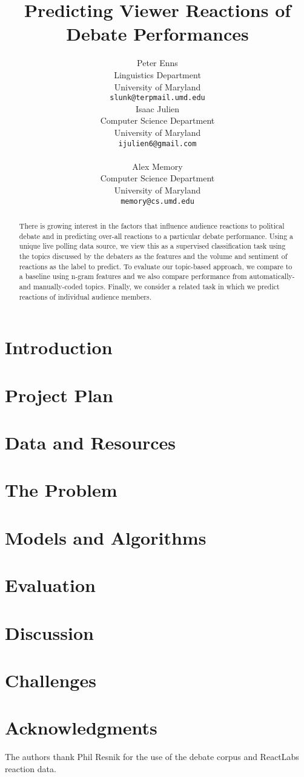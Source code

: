 \documentclass[11pt]{article}
\title{Predicting Viewer Reactions of Debate Performances}
\author{Peter Enns \\
  Linguistics Department \\
  University of Maryland \\
  {\tt slunk@terpmail.umd.edu} \\\And
  Isaac Julien \\
  Computer Science Department \\
  University of Maryland \\
  {\tt ijulien6@gmail.com} \\ \\\And
  Alex Memory \\
  Computer Science Department \\
  University of Maryland \\
  {\tt memory@cs.umd.edu} \\
  }
\date{}
\begin{document}
\maketitle
\begin{abstract}
  There is growing interest in the factors that influence audience reactions to political debate and in predicting over-all reactions to a particular debate performance.  Using a unique live polling data source, we view this as a supervised classification task using the topics discussed by the debaters as the features and the volume and sentiment of reactions as the label to predict.  To evaluate our topic-based approach, we compare to a baseline using n-gram features and we also compare performance from automatically- and manually-coded topics.  Finally, we consider a related task in which we predict reactions of individual audience members.
\end{abstract}

\section{Introduction}


\section{Project Plan}


\section{Data and Resources}


\section{The Problem}


\section{Models and Algorithms}


\section{Evaluation}
\label{sec:evaluation}


\section{Discussion}


\section{Challenges}


\section*{Acknowledgments}
The authors thank Phil Resnik for the use of the debate corpus and ReactLabs reaction data.



\end{document}
